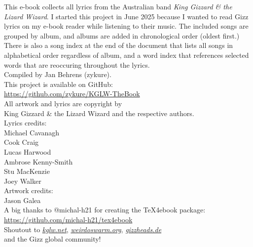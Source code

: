 \begin{center}
\vspace*{\fill}

This e-book collects all lyrics from the Australian band \emph{King Gizzard \& the Lizard Wizard}.
I started this project in June 2025 because I wanted to read Gizz lyrics on my e-book reader while listening to their music.
The included songs are grouped by album, and albums are added in chronological order (oldest first.)
There is also a song index at the end of the document that lists all songs in alphabetical order regardless of album,
and a word index that references selected words that are reoccuring throughout the lyrics.\\[5mm]

Compiled by Jan Behrens (zykure).\\[5mm]

This project is available on GitHub:\\
\href{https://github.com/zykure/KGLW-TheBook}{https://github.com/zykure/KGLW-TheBook}\\[15mm]

All artwork and lyrics are copyright by \\
King Gizzard \& the Lizard Wizard and the respective authors.\\[10mm]

Lyrics credits:\\
Michael Cavanagh\\
Cook Craig\\
Lucas Harwood\\
Ambrose Kenny-Smith\\
Stu MacKenzie\\
Joey Walker\\[10mm]

Artwork credits:\\
Jason Galea\\[15mm]

A big thanks to @michal-h21 for creating the TeX4ebook package:\\
\href{https://github.com/michal-h21/tex4ebook}{https://github.com/michal-h21/tex4ebook}\\[5mm]

Shoutout to \href{https://kglw.net}{\textit{kglw.net}}, \href{https://weirdoswarm.org}{\textit{weirdoswarm.org}}, \href{https://gizzheads.de}{\textit{gizzheads.de}}\\
and the Gizz global community!\\

\vfill
\end{center}
